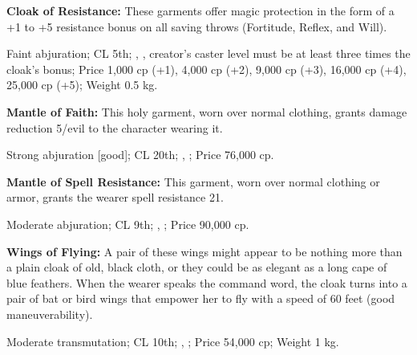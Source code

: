\textbf{Cloak of Resistance:} These garments offer magic protection in the form of a +1 to +5 resistance bonus on all saving throws (Fortitude, Reflex, and Will).

Faint abjuration; CL 5th; , , creator's caster level must be at least three times the cloak's bonus; Price 1,000 cp (+1), 4,000 cp (+2), 9,000 cp (+3), 16,000 cp (+4), 25,000 cp (+5); Weight 0.5 kg.


\textbf{Mantle of Faith:} This holy garment, worn over normal clothing, grants damage reduction 5/evil to the character wearing it.

Strong abjuration [good]; CL 20th; , ; Price 76,000 cp.


\textbf{Mantle of Spell Resistance:} This garment, worn over normal clothing or armor, grants the wearer spell resistance 21.

Moderate abjuration; CL 9th; , ; Price 90,000 cp.


\textbf{Wings of Flying:} A pair of these wings might appear to be nothing more than a plain cloak of old, black cloth, or they could be as elegant as a long cape of blue feathers. When the wearer speaks the command word, the cloak turns into a pair of bat or bird wings that empower her to fly with a speed of 60 feet (good maneuverability).

Moderate transmutation; CL 10th; , ; Price 54,000 cp; Weight 1 kg.
